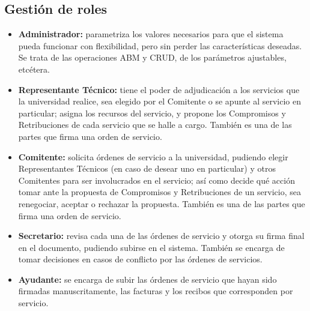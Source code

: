 \subsection*{Gesti\'on de roles}
\begin{itemize}
	\item \textbf{Administrador:} parametriza los
	valores necesarios para que el sistema pueda
	funcionar con flexibilidad, pero sin perder
	las caracter\'isticas deseadas. Se trata de
	las operaciones ABM y CRUD, de los
	par\'ametros ajustables, etc\'etera.
	\item \textbf{Representante T\'ecnico:} tiene
	el poder de adjudicaci\'on a los servicios
	que la universidad realice, sea elegido por
	el Comitente o se apunte al servicio en
	particular; asigna los recursos del servicio,
	y propone los Compromisos y Retribuciones
	de cada servicio que se halle a cargo. Tambi\'en
	es una de las partes que firma una orden de
	servicio.
	\item \textbf{Comitente:} solicita \'ordenes
	de servicio a la universidad, pudiendo elegir
	Representantes T\'ecnicos (en caso de desear
	uno en particular) y otros Comitentes para ser
	involucrados en el servicio; as\'i como decide qu\'e
	acci\'on tomar ante la propuesta de Compromisos
	y Retribuciones de un servicio, sea renegociar,
	aceptar o rechazar la propuesta. Tambi\'en es
	una de las partes que firma una orden de
	servicio.
	\item \textbf{Secretario:} revisa cada una de
	las \'ordenes de servicio y otorga su firma
	final en el documento, pudiendo subirse en
	el sistema. Tambi\'en se encarga de tomar
	decisiones en casos de conflicto por las
	\'ordenes de servicios.
	\item \textbf{Ayudante:} se encarga de subir
	las \'ordenes de servicio que hayan sido
	firmadas manuscritamente, las facturas y los
	recibos que corresponden por servicio.
\end{itemize}
\newpage
